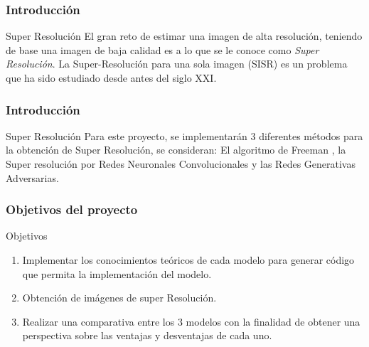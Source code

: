
\begin{frame}
    \frametitle{Introducción}
    \begin{block}{Super Resolución}
        El gran reto de estimar una imagen de alta resolución, teniendo de base una imagen de baja calidad es a lo que se le conoce como 
        \emph{Super Resolución}. La Super-Resolución para una sola imagen (SISR) es un problema que ha sido estudiado desde antes del siglo XXI.
    \end{block}

\end{frame}

\begin{frame}
    \frametitle{Introducción}
    \begin{block}{Super Resolución}
        Para este proyecto, se implementarán 3 diferentes métodos para la obtención de Super Resolución, se consideran: El algoritmo de Freeman \cite{freeman},
        la Super resolución por Redes Neuronales Convolucionales \cite{SRCNN} y las Redes Generativas Adversarias. \cite{SRGAN}
        \end{block}

\end{frame}


\begin{frame}

    \frametitle{Objetivos del proyecto}
    \begin{block}{Objetivos}
        \begin{enumerate}
            \item Implementar los conocimientos teóricos de cada modelo para generar código que
             permita la implementación del modelo.
            \item Obtención de imágenes de super Resolución. 
            \item Realizar una comparativa entre los 3 modelos con la finalidad de obtener
            una perspectiva sobre las ventajas y desventajas de cada uno.
        \end{enumerate}
    \end{block}

\end{frame}
